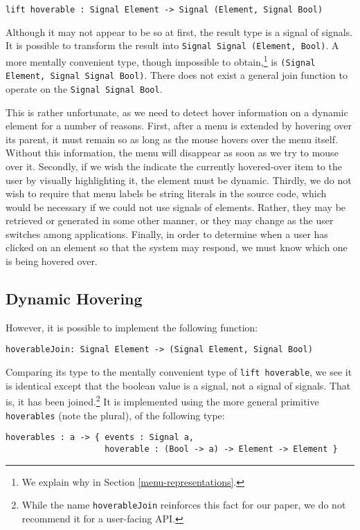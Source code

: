 \documentclass{article}
\begin{document}
\texttt{lift hoverable : Signal Element -> Signal (Element, Signal Bool)}

Although it may not appear to be so at first, the result type is a signal of
signals. It is possible to transform the result into \texttt{Signal Signal
(Element, Bool)}. A more mentally convenient type, though impossible to
obtain,\footnote{We explain why in Section \ref{menu-representations}.}
is \texttt{(Signal Element, Signal Signal Bool)}. There does not exist a general
join function to operate on the \texttt{Signal Signal Bool}.

This is rather unfortunate, as we need to detect hover information on a dynamic
element for a number of reasons. First, after a menu is extended by hovering
over its parent, it must remain so as long as the mouse hovers over the menu
itself. Without this information, the menu will disappear as soon as we try to
mouse over it. Secondly, if we wish the indicate the currently hovered-over item
to the user by visually highlighting it, the element must be dynamic. Thirdly,
we do not wish to require that menu labels be string literals in the source
code, which would be necessary if we could not use signals of elements. Rather,
they may be retrieved or generated in some other manner, or they may change as
the user switches among applications. Finally, in order to determine when a user
has clicked on an element so that the system may respond, we must know which one
is being hovered over.

\subsection{Dynamic Hovering}
However, it is possible to implement the following function:

\texttt{hoverableJoin: Signal Element -> (Signal Element, Signal Bool)}

Comparing its type to the mentally convenient type of \texttt{lift hoverable},
we see it is identical except that the boolean value is a signal, not a signal
of signals. That is, it has been joined.\footnote{While the name
    \texttt{hoverableJoin} reinforces this fact for our paper, we do not
recommend it for a user-facing API.} It is implemented using the more general
primitive \texttt{hoverables} (note the plural), of the following type:

\begin{verbatim}
hoverables : a -> { events : Signal a,
                    hoverable : (Bool -> a) -> Element -> Element }
\end{verbatim}
\end{document}
